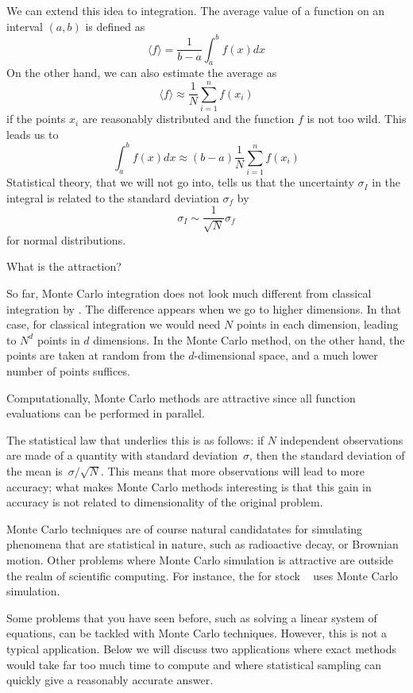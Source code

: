 We can extend this idea to integration. The average value of a
function on an interval $(a,b)$ is defined as
\[ \langle f\rangle = \frac1{b-a}\int_a^bf(x)dx \]
On the other hand, we can also estimate the average as
\[ \langle f\rangle \approx \frac 1N\sum_{i=1}^nf(x_i) \]
if the points $x_i$ are reasonably distributed and the function $f$ is
not too wild. This leads us to
\[ \int_a^bf(x)dx  \approx (b-a) \frac 1N\sum_{i=1}^nf(x_i) \]
Statistical theory, that we will not go into,
tells us that the uncertainty $\sigma_I$ in the integral is related to
the standard deviation $\sigma_f$ by
\[ \sigma_I\sim \frac1{\sqrt N}\sigma_f \]
for normal distributions.

 {What is the attraction?}

So far, Monte Carlo integration does not look much different from
classical integration by .
The difference appears when we go to higher
dimensions. In that case, for classical integration we would need $N$
points in each dimension, leading to $N^d$ points in $d$
dimensions. In the Monte Carlo method, on the other hand, the points
are taken at random from the $d$-dimensional space, and a much lower
number of points suffices.

Computationally, Monte Carlo methods are attractive since all function
evaluations can be performed in parallel.

The
statistical law that underlies this is as follows: if $N$ independent
observations are made of a quantity with standard deviation~$\sigma$,
then the standard deviation of the mean is~$\sigma/\sqrt N$. This
means that more observations will lead to more accuracy; what makes
Monte Carlo methods interesting is that this gain in accuracy is not
related to dimensionality of the original problem.

Monte Carlo techniques are of course natural candidatates for simulating
phenomena that are statistical in nature, such as radioactive decay,
or Brownian motion.
Other problems where Monte Carlo
simulation is attractive are outside the realm of scientific
computing. For instance, the  for stock
~\cite{BlackScholes} uses Monte Carlo simulation.

Some problems that you have seen before, such as solving a linear
system of equations, can be tackled with Monte Carlo
techniques. However, this is not a typical application. Below we will
discuss two applications where exact methods
would take far too much time to compute and where statistical sampling
can quickly give a reasonably accurate answer.

